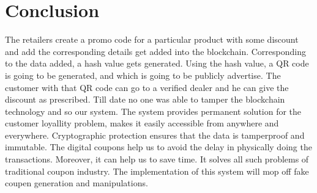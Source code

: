 \chapter{Conclusion}

\par
The retailers create a promo code for a particular product with some
discount and add the corresponding details get added into the blockchain.
Corresponding to the data added, a hash value gets generated. Using the hash
value, a QR code is going to be generated, and which is going to be publicly
advertise. The customer with that QR code can go to a verified dealer and he
can give the discount as prescribed. Till date no one was able to tamper the
blockchain technology and so our system.
The system provides permanent solution for the customer loyallity problem, makes it easily accessible from anywhere and everywhere. Cryptographic protection ensures that the data is tamperproof and immutable. The digital coupons help us to avoid the delay in physically doing the transactions. Moreover, it can help us to save time. It solves all such problems of traditional coupon industry. The implementation of this system will mop off fake coupen generation and manipulations. 
